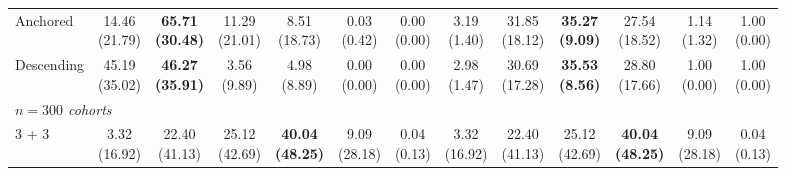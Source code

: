 {\begin{tabular}{l|cccccc|cccccc}
Anchored & \makecell{14.46 \\ (21.79)} & {\cellcolor[HTML]{C8E6C9}} \bfseries \makecell{65.71 \\ (30.48)} & \makecell{11.29 \\ (21.01)} & \makecell{8.51 \\ (18.73)} & \makecell{0.03 \\ (0.42)} & \makecell{0.00 \\ (0.00)} & \makecell{3.19 \\ (1.40)} & {\cellcolor[HTML]{C8E6C9}} \makecell{31.85 \\ (18.12)} & \bfseries \makecell{35.27 \\ (9.09)} & \makecell{27.54 \\ (18.52)} & \makecell{1.14 \\ (1.32)} & \makecell{1.00 \\ (0.00)} \\
Descending & \makecell{45.19 \\ (35.02)} & {\cellcolor[HTML]{C8E6C9}} \bfseries \makecell{46.27 \\ (35.91)} & \makecell{3.56 \\ (9.89)} & \makecell{4.98 \\ (8.89)} & \makecell{0.00 \\ (0.00)} & \makecell{0.00 \\ (0.00)} & \makecell{2.98 \\ (1.47)} & {\cellcolor[HTML]{C8E6C9}} \makecell{30.69 \\ (17.28)} & \bfseries \makecell{35.53 \\ (8.56)} & \makecell{28.80 \\ (17.66)} & \makecell{1.00 \\ (0.00)} & \makecell{1.00 \\ (0.00)} \\
\midrule
\multicolumn{13}{l}{\emph{$n = 300$ cohorts}} \\
3 + 3 & \makecell{3.32 \\ (16.92)} & {\cellcolor[HTML]{C8E6C9}} \makecell{22.40 \\ (41.13)} & \makecell{25.12 \\ (42.69)} & \bfseries \makecell{40.04 \\ (48.25)} & \makecell{9.09 \\ (28.18)} & \makecell{0.04 \\ (0.13)} & \makecell{3.32 \\ (16.92)} & {\cellcolor[HTML]{C8E6C9}} \makecell{22.40 \\ (41.13)} & \makecell{25.12 \\ (42.69)} & \bfseries \makecell{40.04 \\ (48.25)} & \makecell{9.09 \\ (28.18)} & \makecell{0.04 \\ (0.13)} \\

\end{tabular}}
